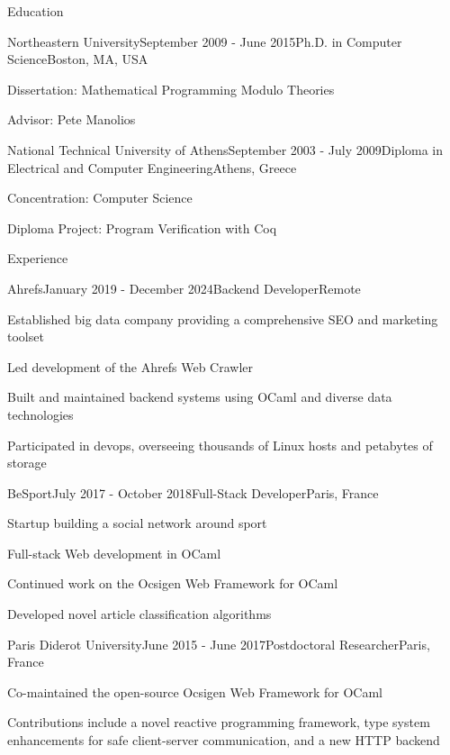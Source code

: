 \documentclass[11pt]{resume}
\begin{document}
\begin{rSection}{Education}

  \begin{rSubsection}{Northeastern University}{September 2009 -
      June 2015}{Ph.D. in Computer Science}{Boston, MA, USA}
  \item Dissertation: Mathematical Programming Modulo Theories
  \item Advisor: Pete Manolios
  \end{rSubsection}

  \begin{rSubsection}{National Technical University of Athens}{September 2003 -
      July 2009}{Diploma in Electrical and Computer
      Engineering}{Athens, Greece}
  \item Concentration: Computer Science
  \item Diploma Project: Program Verification with Coq
  \end{rSubsection}
	
\end{rSection}

\begin{rSection}{Experience}

  \begin{rSubsection}{Ahrefs}{January 2019 - December 2024}{Backend
      Developer}{Remote}
  \item Established big data company providing a comprehensive SEO and marketing toolset
  \item Led development of the Ahrefs Web Crawler
  \item Built and maintained backend systems using OCaml and diverse data technologies
  \item Participated in devops, overseeing thousands of Linux hosts
    and petabytes of storage
  \end{rSubsection}

  \begin{rSubsection}{BeSport}{July 2017 - October 2018}{Full-Stack
      Developer}{Paris, France}
  \item Startup building a social network around sport
  \item Full-stack Web development in OCaml
  \item Continued work on the Ocsigen Web Framework for OCaml
  \item Developed novel article classification algorithms
  \end{rSubsection}

  \begin{rSubsection}{Paris Diderot University}{June 2015 - June
      2017}{Postdoctoral Researcher}{Paris, France}
  \item Co-maintained the open-source Ocsigen Web Framework for OCaml
  \item Contributions include a novel reactive programming framework,
    type system enhancements for safe client-server communication, and
    a new HTTP backend
  \end{rSubsection}

\end{rSection}
\end{document}
